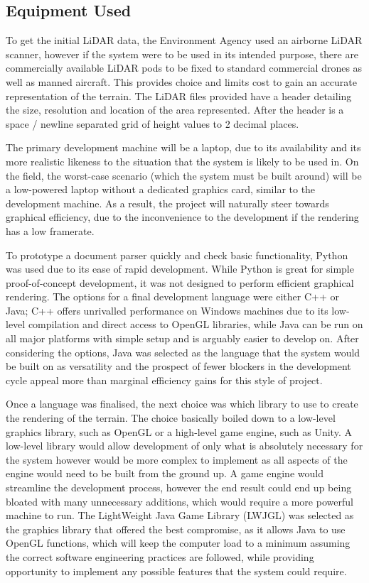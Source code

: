 \documentclass[12pt,a4paper]{article}
\begin{document}
  \subsection{Equipment Used}
  \noindent To get the initial LiDAR data, the Environment Agency used an airborne LiDAR scanner, however if the system were to be used in its intended purpose, there are commercially available LiDAR pods to be fixed to standard commercial drones as well as manned aircraft. This provides choice and limits cost to gain an accurate representation of the terrain. The LiDAR files provided have a header detailing the size, resolution and location of the area represented. After the header is a space / newline separated grid of height values to 2 decimal places.
  \par The primary development machine will be a laptop, due to its availability and its more realistic likeness to the situation that the system is likely to be used in. On the field, the worst-case scenario (which the system must be built around) will be a low-powered laptop without a dedicated graphics card, similar to the development machine. As a result, the project will naturally steer towards graphical efficiency, due to the inconvenience to the development if the rendering has a low framerate.
  \par To prototype a document parser quickly and check basic functionality, Python was used due to its ease of rapid development. While Python is great for simple proof-of-concept development, it was not designed to perform efficient graphical rendering. The options for a final development language were either C++ or Java; C++ offers unrivalled performance on Windows machines due to its low-level compilation and direct access to OpenGL libraries, while Java can be run on all major platforms with simple setup and is arguably easier to develop on. After considering the options, Java was selected as the language that the system would be built on as versatility and the prospect of fewer blockers in the development cycle appeal more than marginal efficiency gains for this style of project.
  \par Once a language was finalised, the next choice was which library to use to create the rendering of the terrain. The choice basically boiled down to a low-level graphics library, such as OpenGL or a high-level game engine, such as Unity. A low-level library would allow development of only what is absolutely necessary for the system however would be more complex to implement as all aspects of the engine would need to be built from the ground up. A game engine would streamline the development process, however the end result could end up being bloated with many unnecessary additions, which would require a more powerful machine to run. The LightWeight Java Game Library (LWJGL) was selected as the graphics library that offered the best compromise, as it allows Java to use OpenGL functions, which will keep the computer load to a minimum assuming the correct software engineering practices are followed, while providing opportunity to implement any possible features that the system could require.
\end{document}
